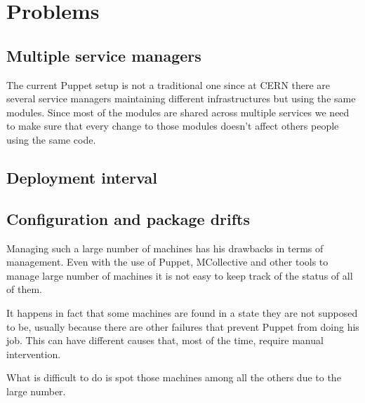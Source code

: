 \section{Problems}

\subsection{Multiple service managers}

The current Puppet setup is not a traditional one since at CERN there are
several service managers maintaining different infrastructures but using
the same modules. Since most of the modules are shared across multiple
services we need to make sure that every change to those modules doesn't
affect others people using the same code.

\subsection{Deployment interval}



\subsection{Configuration and package drifts}

Managing such a large number of machines has his drawbacks in terms of
management. Even with the use of Puppet, MCollective and other tools to
manage large number of machines it is not easy to keep track of the status
of all of them.

It happens in fact that some machines are found in a state they are not
supposed to be, usually because there are other failures that prevent
Puppet from doing his job. This can have different causes that, most of
the time, require manual intervention.

What is difficult to do is spot those machines among all the others due to
the large number.

